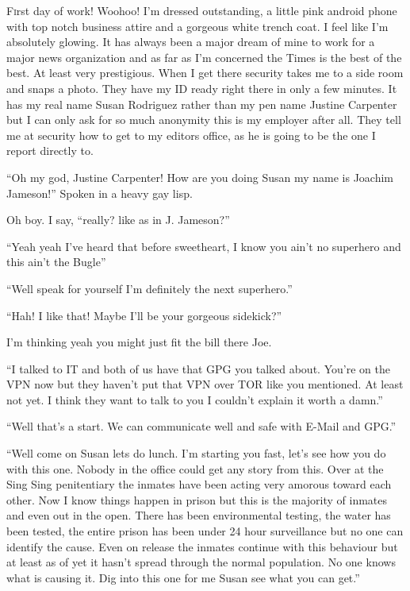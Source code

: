 \lettrine[lines=2,lraise=0]{F}{i}rst day of work! Woohoo! I'm dressed outstanding, a little pink android phone with top notch business attire and a gorgeous white trench coat. I feel like I'm absolutely glowing. It has always been a major dream of mine to work for a major news organization and as far as I'm concerned the Times is the best of the best. At least very prestigious. When I get there security takes me to a side room and snaps a photo. They have my ID ready right there in only a few minutes. It has my real name Susan Rodriguez rather than my pen name Justine Carpenter but I can only ask for so much anonymity this is my employer after all. They tell me at security how to get to my editors office, as he is going to be the one I report directly to.

``Oh my god, Justine Carpenter! How are you doing Susan my name is Joachim Jameson!'' Spoken in a heavy gay lisp. 

Oh boy. I say, ``really? like as in J. Jameson?''

``Yeah yeah I've heard that before sweetheart, I know you ain't no superhero and this ain't the Bugle''

``Well speak for yourself I'm definitely the next superhero.''

``Hah! I like that! Maybe I'll be your gorgeous sidekick?''

I'm thinking yeah you might just fit the bill there Joe.

``I talked to IT and both of us have that GPG you talked about. You're on the VPN now but they haven't put that VPN over TOR like you mentioned. At least not yet. I think they want to talk to you I couldn't explain it worth a damn.''

``Well that's a start. We can communicate well and safe with E-Mail and GPG.''

``Well come on Susan lets do lunch. I'm starting you fast, let's see how you do with this one. Nobody in the office could get any story from this. Over at the Sing Sing penitentiary the inmates have been acting very amorous toward each other. Now I know things happen in prison but this is the majority of inmates and even out in the open. There has been environmental testing, the water has been tested, the entire prison has been under 24 hour surveillance but no one can identify the cause. Even on release the inmates continue with this behaviour but at least as of yet it hasn't spread through the normal population. No one knows what is causing it. Dig into this one for me Susan see what you can get.''

